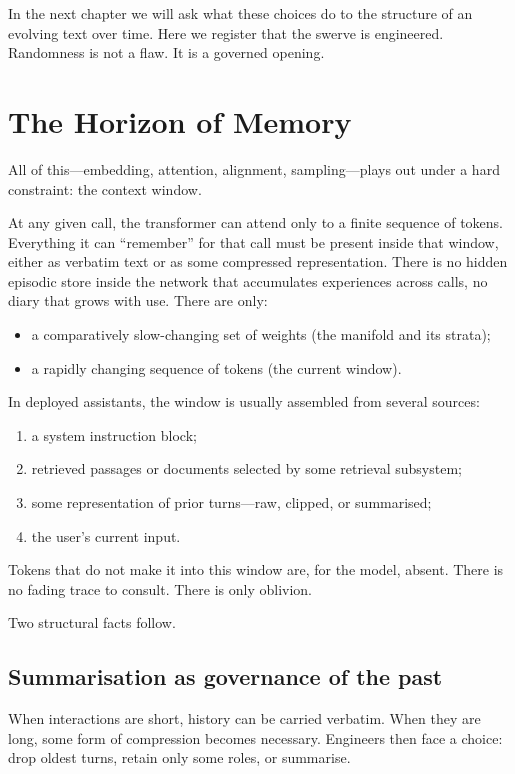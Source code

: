 In the next chapter we will ask what these choices do to the structure of an evolving text over time. Here we register that the swerve is engineered. Randomness is not a flaw. It is a governed opening.

\section{The Horizon of Memory}

All of this---embedding, attention, alignment, sampling---plays out under a hard constraint: the context window.

At any given call, the transformer can attend only to a finite sequence of tokens. Everything it can ``remember'' for that call must be present inside that window, either as verbatim text or as some compressed representation. There is no hidden episodic store inside the network that accumulates experiences across calls, no diary that grows with use. There are only:

\begin{itemize}
  \item a comparatively slow-changing set of weights (the manifold and its strata);
  \item a rapidly changing sequence of tokens (the current window).
\end{itemize}

In deployed assistants, the window is usually assembled from several sources:

\begin{enumerate}
  \item a system instruction block;
  \item retrieved passages or documents selected by some retrieval subsystem;
  \item some representation of prior turns---raw, clipped, or summarised;
  \item the user's current input.
\end{enumerate}

Tokens that do not make it into this window are, for the model, absent. There is no fading trace to consult. There is only oblivion.

Two structural facts follow.

\subsection*{Summarisation as governance of the past}

When interactions are short, history can be carried verbatim. When they are long, some form of compression becomes necessary. Engineers then face a choice: drop oldest turns, retain only some roles, or summarise.


